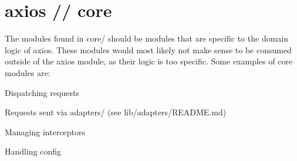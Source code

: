 \chapter{axios // core}
\hypertarget{md_pkiclassroomrescheduler_2src_2main_2frontend_2node__modules_2axios_2lib_2core_2_r_e_a_d_m_e}{}\label{md_pkiclassroomrescheduler_2src_2main_2frontend_2node__modules_2axios_2lib_2core_2_r_e_a_d_m_e}
\label{md_pkiclassroomrescheduler_2src_2main_2frontend_2node__modules_2axios_2lib_2core_2_r_e_a_d_m_e_autotoc_md5605}%
%
 The modules found in {\ttfamily core/} should be modules that are specific to the domain logic of axios. These modules would most likely not make sense to be consumed outside of the axios module, as their logic is too specific. Some examples of core modules are\+:


\begin{DoxyItemize}
\item Dispatching requests
\begin{DoxyItemize}
\item Requests sent via {\ttfamily adapters/} (see lib/adapters/\+README.\+md)
\end{DoxyItemize}
\item Managing interceptors
\item Handling config 
\end{DoxyItemize}